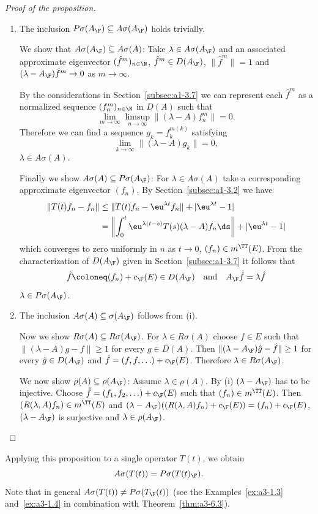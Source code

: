\begin{proof}[Proof of the proposition]
\begin{enumerate}[\upshape (i), wide, labelindent=.25em]
\item 
The inclusion $P\sigma(A_{\F}) \subseteq A\sigma(A_{\F})$ holds trivially.

We show that $A\sigma(A_{\F}) \subseteq A\sigma(A)$: Take $\lambda \in A\sigma(A_{\F})$ and an associated approximate eigenvector $({\hat{f}^{m}})_{n \in \N}$, \ie $\hat{f}^{m} \in D(A_{\F})$, $\|\hat{f}^{m}\| = 1$ and $(\lambda-A_{\F})\hat{f}^{m} \to 0$ as $m \to \infty$.

By the considerations in Section~\ref{subsec:a1-3.7} we can represent each $\hat{f}^{m}$ as a normalized sequence $(f_{n}^{m})_{n \in \N}$ in $D(A)$ such that
\[
\lim_{m \to \infty} \limsup_{n \to \infty} \|(\lambda-A)f_{n}^{m}\| = 0 .
\]
Therefore we can find a sequence $g_{k} = f_{k}^{m(k)}$ satisfying
\[
\lim_{k \to \infty} \|(\lambda-A)g_{k}\| = 0 ,
\]
\ie $\lambda \in A\sigma(A)$.

Finally we show $A\sigma(A) \subseteq P\sigma(A_{\F})$: For $\lambda \in A\sigma(A)$ take a corresponding approximate eigenvector $(f_{n})$.
By Section~\ref{subsec:a1-3.2} we have
\begin{align*}
\|T(t)f_{n} - f_{n}\| &\leq \|T(t)f_{n} - \eu^{\lambda t}f_{n}\| + |\eu^{\lambda t} - 1| \\
&= \left\|\int_{0}^{t} \eu^{\lambda(t-s)}T(s)(\lambda-A)f_{n} \ds\right\| + |\eu^{\lambda t} - 1|
\end{align*}
which converges to zero uniformly in $n$ as $t \to 0$, \ie $(f_{n}) \in m^{\TT}(E)$.
From the characterization of\/ $D(A_{\F})$ given in Section~\ref{subsec:a1-3.7} it follows that
\[
	\hat{f} \coloneq (f_{n}) + c_{\F}(E) \in D(A_{\F})
	\quad \text{and} \quad
	A_{\F}\hat{f} = \lambda\hat{f}
\]
\ie  $\lambda \in P\sigma(A_{\F}) $.

\item 
The inclusion $A\sigma(A) \subseteq \sigma(A_{\F})$ follows from (i). 

Now we show $R\sigma(A) \subseteq R\sigma(A_{\F})$.
For $\lambda \in R\sigma(A)$ choose $f \in E$ such that $\|(\lambda-A)g - f\| \geq 1$ for every $g \in D(A)$.
Then $\|(\lambda-A_{\F})\hat{g} - \hat{f}\| \geq 1$ for every $\hat{g} \in D(A_{\F})$ and $\hat{f} = (f,f,\ldots) + c_{\F}(E)$.
Therefore $\lambda \in R\sigma(A_{\F})$.

We now show $\rho(A) \subseteq \rho(A_{\F})$: Assume $\lambda \in \rho(A)$.
By (i) $(\lambda-A_{\F})$ has to be injective.
Choose $\hat{f} = (f_{1},f_{2},\ldots) + c_{\F}(E)$ such that $(f_{n}) \in m^{\TT}(E)$.
Then $(R(\lambda,A)f_{n}) \in m^{\TT}(E)$ and $(\lambda-A_{\F})((R(\lambda,A)f_{n})+c_{\F}(E)) = (f_{n}) + c_{\F}(E)$, \ie $(\lambda-A_{\F})$ is surjective and $\lambda \in \rho(A_{\F})$.
\qedhere
\end{enumerate}
\end{proof}
Applying this proposition to a single operator $T(t)$, we obtain
\[
A\sigma(T(t)) = P\sigma(T(t)_{\F}) .
\]
Note that in general $A\sigma(T(t)) \neq P\sigma(T_{\F}(t))$ (see the Examples~\ref{ex:a3-1.3} and~\ref{ex:a3-1.4} in combination with Theorem~\ref{thm:a3-6.3}).
